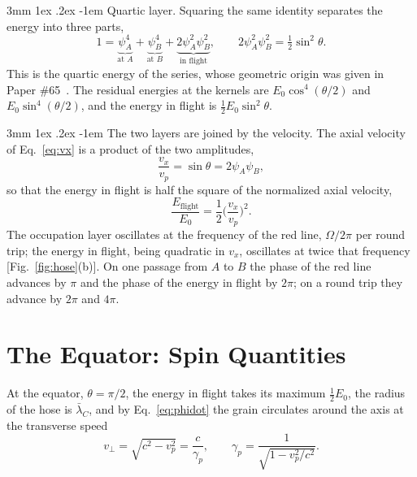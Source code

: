 \documentclass[%
 reprint, amsmath,amssymb, aps, prb, ]{revtex4-2}
\makeatletter
\numberwithin{equation}{section}
\renewcommand\paragraph{%
  \@startsection{paragraph}{4}{\z@}%
    {3mm \@plus 1ex \@minus .2ex}%
    {-1em}%
    {\normalfont\normalsize\itshape}}
\newcommand{\lbar}{\bar{\lambda}_C}
\makeatother
\begin{document}
\paragraph{Quartic layer.} Squaring the same identity separates the energy into three parts,
\begin{equation}
1 = \underbrace{\psi_A^4}_{\text{at }A} + \underbrace{\psi_B^4}_{\text{at }B} + \underbrace{2\psi_A^2\psi_B^2}_{\text{in flight}},
\qquad 2\psi_A^2\psi_B^2 = \tfrac12\sin^2\theta .
\label{eq:quartic}
\end{equation}
This is the quartic energy of the series, whose geometric origin was given in Paper \#65~\cite{H65}. The residual energies at the kernels are $E_0\cos^4(\theta/2)$ and $E_0\sin^4(\theta/2)$, and the energy in flight is $\tfrac12E_0\sin^2\theta$.

\paragraph{The two layers are joined by the velocity.} The axial velocity of Eq.~\eqref{eq:vx} is a product of the two amplitudes,
\begin{equation}
\frac{v_x}{v_p} = \sin\theta = 2\psi_A\psi_B ,
\label{eq:vprod}
\end{equation}
so that the energy in flight is half the square of the normalized axial velocity,
\begin{equation}
\frac{E_{\text{flight}}}{E_0} = \frac12\Big(\frac{v_x}{v_p}\Big)^2 .
\label{eq:flightv}
\end{equation}
The occupation layer oscillates at the frequency of the red line, $\Omega/2\pi$ per round trip; the energy in flight, being quadratic in $v_x$, oscillates at twice that frequency [Fig.~\ref{fig:hose}(b)]. On one passage from $A$ to $B$ the phase of the red line advances by $\pi$ and the phase of the energy in flight by $2\pi$; on a round trip they advance by $2\pi$ and $4\pi$.

\section{The Equator: Spin Quantities}
\label{sec:ring}

At the equator, $\theta = \pi/2$, the energy in flight takes its maximum $\tfrac12E_0$, the radius of the hose is $\lbar$, and by Eq.~\eqref{eq:phidot} the grain circulates around the axis at the transverse speed
\begin{equation}
v_\perp = \sqrt{c^2 - v_p^2} = \frac{c}{\gamma_p}, \qquad \gamma_p = \frac{1}{\sqrt{1 - v_p^2/c^2}} .
\label{eq:vperp}
\end{equation}
\end{document}
